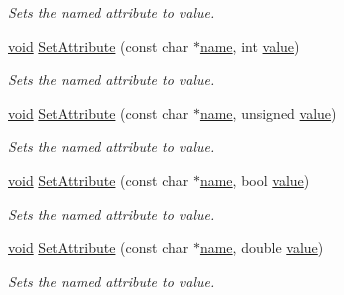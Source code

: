 \begin{DoxyCompactItemize}
\begin{DoxyCompactList}\small\item\em Sets the named attribute to value. \end{DoxyCompactList}\item 
\mbox{\label{classtinyxml2_1_1_x_m_l_element_aae6568c64c7f1cc88be8461ba41a79cf}} 
\hyperlink{interfacevoid}{void} \hyperlink{classtinyxml2_1_1_x_m_l_element_aae6568c64c7f1cc88be8461ba41a79cf}{Set\+Attribute} (const char $\ast$\hyperlink{structname}{name}, int \hyperlink{unionvalue}{value})
\begin{DoxyCompactList}\small\item\em Sets the named attribute to value. \end{DoxyCompactList}\item 
\mbox{\label{classtinyxml2_1_1_x_m_l_element_ae143997e90064ba82326b29a9930ea8f}} 
\hyperlink{interfacevoid}{void} \hyperlink{classtinyxml2_1_1_x_m_l_element_ae143997e90064ba82326b29a9930ea8f}{Set\+Attribute} (const char $\ast$\hyperlink{structname}{name}, unsigned \hyperlink{unionvalue}{value})
\begin{DoxyCompactList}\small\item\em Sets the named attribute to value. \end{DoxyCompactList}\item 
\mbox{\label{classtinyxml2_1_1_x_m_l_element_aa848b696e6a75e4e545c6da9893b11e1}} 
\hyperlink{interfacevoid}{void} \hyperlink{classtinyxml2_1_1_x_m_l_element_aa848b696e6a75e4e545c6da9893b11e1}{Set\+Attribute} (const char $\ast$\hyperlink{structname}{name}, bool \hyperlink{unionvalue}{value})
\begin{DoxyCompactList}\small\item\em Sets the named attribute to value. \end{DoxyCompactList}\item 
\mbox{\label{classtinyxml2_1_1_x_m_l_element_a233397ee81e70eb5d4b814c5f8698533}} 
\hyperlink{interfacevoid}{void} \hyperlink{classtinyxml2_1_1_x_m_l_element_a233397ee81e70eb5d4b814c5f8698533}{Set\+Attribute} (const char $\ast$\hyperlink{structname}{name}, double \hyperlink{unionvalue}{value})
\begin{DoxyCompactList}\small\item\em Sets the named attribute to value. \end{DoxyCompactList}\item 

\end{DoxyCompactItemize}
